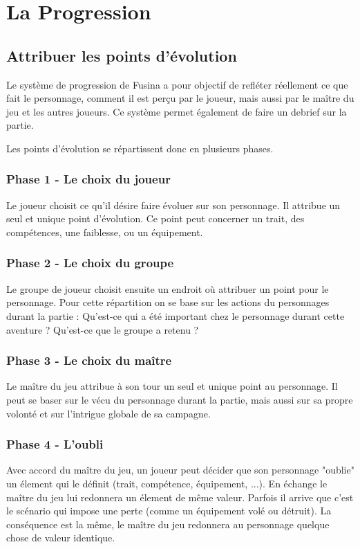 \documentclass{conf/FusinaClass}
\begin{document}
\part{La Progression}
\chapter{Attribuer les points d'évolution}
Le système de progression de Fusina a pour objectif de refléter réellement ce que fait le personnage, comment il est perçu par le joueur, mais aussi par le maître du jeu et les autres joueurs. Ce système permet également de faire un debrief sur la partie.

Les points d'évolution se répartissent donc en plusieurs phases.

\section{Phase 1 - Le choix du joueur}
Le joueur choisit ce qu'il désire faire évoluer sur son personnage. Il attribue un seul et unique point d'évolution. Ce point peut concerner un trait, des compétences, une faiblesse, ou un équipement.

\section{Phase 2 - Le choix du groupe}
Le groupe de joueur choisit ensuite un endroit où attribuer un point pour le personnage. Pour cette répartition on se base sur les actions du personnages durant la partie : Qu'est-ce qui a été important chez le personnage durant cette aventure ? Qu'est-ce que le groupe a retenu ?

\section{Phase 3 - Le choix du maître}
Le maître du jeu attribue à son tour un seul et unique point au personnage. Il peut se baser sur le vécu du personnage durant la partie, mais aussi sur sa propre volonté et sur l'intrigue globale de sa campagne.

\section{Phase 4 - L'oubli}
Avec accord du maître du jeu, un joueur peut décider que son personnage "oublie" un élement qui le définit (trait, compétence, équipement, ...). En échange le maître du jeu lui redonnera un élement de même valeur. Parfois il arrive que c'est le scénario qui impose une perte (comme un équipement volé ou détruit). La conséquence est la même, le maître du jeu redonnera au personnage quelque chose de valeur identique.
\end{document}
